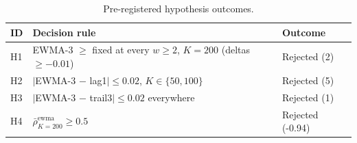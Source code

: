 \begin{table}[!t]
 \caption{Pre-registered hypothesis outcomes.}
 \label{tab:hypotheses}
 \centering
 \small
 \setlength{\tabcolsep}{4pt}
 \begin{tabular}{@{}p{0.5cm}p{5.0cm}p{1.8cm}@{}}
 \toprule
 \textbf{ID} & \textbf{Decision rule} & \textbf{Outcome} \\
 \midrule
 H1 & EWMA-3 $\geq$ fixed at every $w\geq 2$, $K=200$ (deltas $\geq -0.01$) & Rejected (2) \\
 H2 & $|$EWMA-3 $-$ lag1$|\leq 0.02$, $K\in\{50,100\}$ & Rejected (5) \\
 H3 & $|$EWMA-3 $-$ trail3$|\leq 0.02$ everywhere & Rejected (1) \\
 H4 & $\bar\rho^{\mathrm{ewma}}_{K=200}\geq 0.5$ & Rejected (-0.94) \\
 \bottomrule
 \end{tabular}
\end{table}
